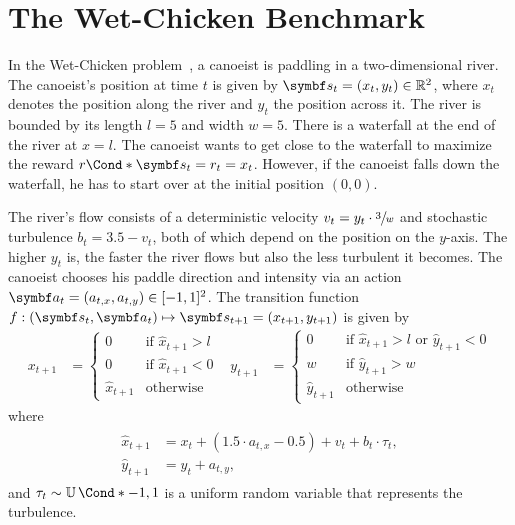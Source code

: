 \section{The Wet-Chicken Benchmark}
\label{toc:interpretable_rl:wetchicken}
In the Wet-Chicken problem~\parencite{tresp_wet_1994,hans_efficient_2009}, a canoeist is paddling in a two-dimensional river.
The canoeist's position at time $t$ is given by $\mat{s}_t = (x_t, y_t) \in \Rb^2$, where $x_t$ denotes the position along the river and $y_t$ the position across it.
The river is bounded by its length $l = 5$ and width $w = 5$.
There is a waterfall at the end of the river at $x = l$.
The canoeist wants to get close to the waterfall to maximize the reward $\Fun*{r}{\mat{s}_t} = r_t = x_t$.
However, if the canoeist falls down the waterfall, he has to start over at the initial position $(0, 0)$.

The river's flow consists of a deterministic velocity $v_t = y_t \cdot \sfrac{3}{w}$ and stochastic turbulence $b_t = 3.5 - v_t$, both of which depend on the position on the $y$-axis.
The higher $y_t$ is, the faster the river flows but also the less turbulent it becomes.
The canoeist chooses his paddle direction and intensity via an action $\mat{a}_t = (a_{t,x}, a_{t,y}) \in [-1, 1]^2$.
The transition function $f : (\mat{s}_t, \mat{a}_t) \mapsto \mat{s}_{t+1} = (x_{t+1}, y_{t+1})$ is given by
\begin{align}
    x_{t+1} & = \begin{cases}
        0             & \text{if } \hat{x}_{t+1} > l \\
        0             & \text{if } \hat{x}_{t+1} < 0 \\
        \hat{x}_{t+1} & \text{otherwise}
    \end{cases} &
    y_{t+1} & = \begin{cases}
        0             & \text{if } \hat{x}_{t+1} > l \text{ or } \hat{y}_{t+1} < 0 \\
        w             & \text{if } \hat{y}_{t+1} > w                               \\
        \hat{y}_{t+1} & \text{otherwise}
    \end{cases}
\end{align}
where
\begin{align}
    \begin{split}
        \hat{x}_{t+1} &= x_t + (1.5 \cdot a_{t, x} - 0.5)  + v_t + b_t \cdot \tau_t, \\
        \hat{y}_{t+1} &= y_t + a_{t, y},
    \end{split}
\end{align}
and $\tau_t \sim \Fun*{\Uni}{-1, 1}$ is a uniform random variable that represents the turbulence.

